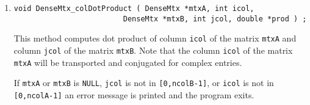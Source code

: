 \begin{enumerate}
\item
\begin{verbatim}
void DenseMtx_colDotProduct ( DenseMtx *mtxA, int icol,
                         DenseMtx *mtxB, int jcol, double *prod ) ;
\end{verbatim}
\par
This method computes dot product of column {\tt icol} of 
the matrix {\tt mtxA} and column {\tt jcol} of the matrix {\tt mtxB}.  
Note that the  column {\tt icol} of the matrix {\tt mtxA} will be
transported and conjugated for complex entries.
\par {}
If {\tt mtxA} or {\tt mtxB} is {\tt NULL}, {\tt jcol} is not in 
{\tt [0,ncolB-1]}, or {\tt icol} is not in {\tt [0,ncolA-1]} 
an error message is printed and the program exits.


\end{enumerate}
